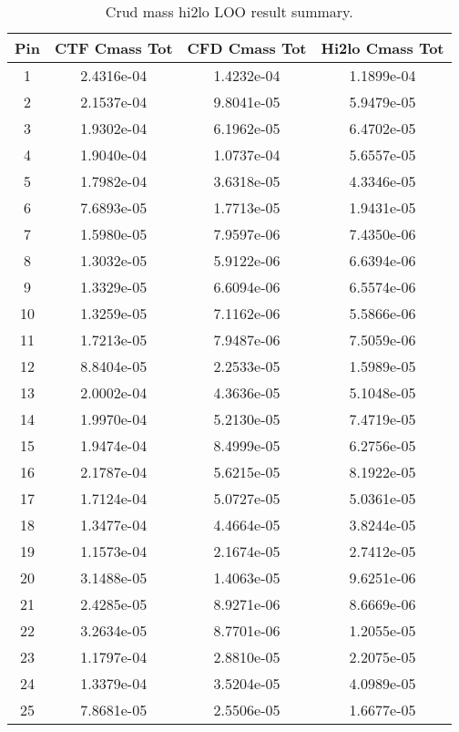 \begin{table}[h]
    \begin{center}
        \caption[Hi2lo crud mass results]{Crud mass hi2lo LOO result summary.}
    \begin{tabular}[h]{|c|c|c|c|} 
        \hline
  Pin & CTF Cmass Tot & CFD Cmass Tot & Hi2lo Cmass Tot  \\ 
\hline
1  & 2.4316e-04 & 1.4232e-04 & 1.1899e-04 \\ 
2  & 2.1537e-04 & 9.8041e-05 & 5.9479e-05 \\ 
3  & 1.9302e-04 & 6.1962e-05 & 6.4702e-05 \\ 
4  & 1.9040e-04 & 1.0737e-04 & 5.6557e-05 \\ 
5  & 1.7982e-04 & 3.6318e-05 & 4.3346e-05 \\ 
6  & 7.6893e-05 & 1.7713e-05 & 1.9431e-05 \\ 
7  & 1.5980e-05 & 7.9597e-06 & 7.4350e-06 \\ 
8  & 1.3032e-05 & 5.9122e-06 & 6.6394e-06 \\ 
9  & 1.3329e-05 & 6.6094e-06 & 6.5574e-06 \\ 
10  & 1.3259e-05 & 7.1162e-06 & 5.5866e-06 \\ 
11  & 1.7213e-05 & 7.9487e-06 & 7.5059e-06 \\ 
12  & 8.8404e-05 & 2.2533e-05 & 1.5989e-05 \\ 
13  & 2.0002e-04 & 4.3636e-05 & 5.1048e-05 \\ 
14  & 1.9970e-04 & 5.2130e-05 & 7.4719e-05 \\ 
15  & 1.9474e-04 & 8.4999e-05 & 6.2756e-05 \\ 
16  & 2.1787e-04 & 5.6215e-05 & 8.1922e-05 \\ 
17  & 1.7124e-04 & 5.0727e-05 & 5.0361e-05 \\ 
18  & 1.3477e-04 & 4.4664e-05 & 3.8244e-05 \\ 
19  & 1.1573e-04 & 2.1674e-05 & 2.7412e-05 \\ 
20  & 3.1488e-05 & 1.4063e-05 & 9.6251e-06 \\ 
21  & 2.4285e-05 & 8.9271e-06 & 8.6669e-06 \\ 
22  & 3.2634e-05 & 8.7701e-06 & 1.2055e-05 \\ 
23  & 1.1797e-04 & 2.8810e-05 & 2.2075e-05 \\ 
24  & 1.3379e-04 & 3.5204e-05 & 4.0989e-05 \\ 
25  & 7.8681e-05 & 2.5506e-05 & 1.6677e-05 \\ 
\hline
\end{tabular}
\label{tab:loo_crud_cmass}
\end{center}
\end{table}

